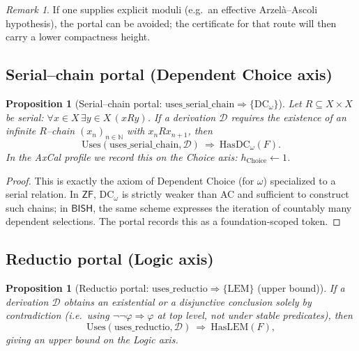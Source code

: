 \documentclass[11pt]{article}
\newtheorem{proposition}[theorem]{Proposition}
\theoremstyle{definition}
\theoremstyle{remark}
\newtheorem{remark}[theorem]{Remark}
\newcommand{\BISH}{\mathsf{BISH}}
\newcommand{\ZF}{\mathsf{ZF}}
\newcommand{\LEM}{\mathrm{LEM}}
\newcommand{\DCw}{\mathrm{DC}_\omega}
\newcommand{\hChoice}{h_{\mathrm{Choice}}}    %
\begin{document}
\begin{remark}
If one supplies explicit moduli (e.g.\ an effective Arzelà–Ascoli hypothesis), the portal can be avoided; the certificate for that route will then carry a lower compactness height.
\end{remark}

\subsection{Serial–chain portal (Dependent Choice axis)}

\begin{proposition}[Serial–chain portal: $\mathrm{uses\_serial\_chain}\Rightarrow\{\DCw\}$]
\label{prop:dc-portal}
Let $R\subseteq X\times X$ be serial: $\forall x\in X\,\exists y\in X\,(xRy)$. If a derivation $\mathcal{D}$ requires the existence of an infinite $R$–chain $(x_n)_{n\in\mathbb{N}}$ with $x_n R x_{n+1}$, then
\[
\mathrm{Uses}(\mathrm{uses\_serial\_chain},\mathcal{D})\ \Rightarrow\ \mathrm{HasDC}_\omega(F).
\]
In the AxCal profile we record this on the Choice axis: $\hChoice \gets 1$.
\end{proposition}

\begin{proof}
This is exactly the axiom of Dependent Choice (for $\omega$) specialized to a serial relation. In $\ZF$, $\DCw$ is strictly weaker than AC and sufficient to construct such chains; in $\BISH$, the same scheme expresses the iteration of countably many dependent selections. The portal records this as a foundation‑scoped token. \qedhere
\end{proof}

\subsection{Reductio portal (Logic axis)}

\begin{proposition}[Reductio portal: $\mathrm{uses\_reductio}\Rightarrow\{\LEM\}$ (upper bound)]
\label{prop:reductio-portal}
If a derivation $\mathcal{D}$ obtains an \emph{existential} or a \emph{disjunctive} conclusion solely by contradiction (i.e.\ using $\neg\neg\varphi\Rightarrow\varphi$ at top level, not under stable predicates), then
\[
\mathrm{Uses}(\mathrm{uses\_reductio},\mathcal{D})\ \Rightarrow\ \mathrm{HasLEM}(F),
\]
giving an upper bound on the Logic axis.
\end{proposition}
\end{document}
